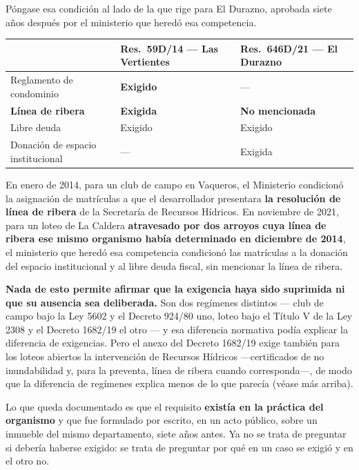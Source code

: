 \begin{cautela}
Póngase esa condición al lado de la que rige para El Durazno, aprobada siete años después por el ministerio que heredó esa competencia.

\begin{center}\small
\begin{tabular}{@{}p{3.4cm}p{4.3cm}p{4.3cm}@{}}
\toprule
& \textbf{Res.\ 59D/14} --- Las Vertientes & \textbf{Res.\ 646D/21} --- El Durazno \\
\midrule
Reglamento de condominio & \textbf{Exigido} & --- \\
\textbf{Línea de ribera} & \textbf{Exigida} & \textbf{No mencionada} \\
Libre deuda & Exigido & Exigido \\
Donación de espacio institucional & --- & Exigida \\
\bottomrule
\end{tabular}
\end{center}

En enero de 2014, para un club de campo en Vaqueros, el Ministerio condicionó la asignación de matrículas a que el desarrollador presentara \textbf{la resolución de línea de ribera} de la Secretaría de Recursos Hídricos. En noviembre de 2021, para un loteo de La Caldera \textbf{atravesado por dos arroyos cuya línea de ribera ese mismo organismo había determinado en diciembre de 2014}, el ministerio que heredó esa competencia condicionó las matrículas a la donación del espacio institucional y al libre deuda fiscal, sin mencionar la línea de ribera.

\textbf{Nada de esto permite afirmar que la exigencia haya sido suprimida ni que su ausencia sea deliberada.} Son dos regímenes distintos --- club de campo bajo la Ley 5602 y el Decreto 924/80 uno, loteo bajo el Título V de la Ley 2308 y el Decreto 1682/19 el otro --- y esa diferencia normativa podía explicar la diferencia de exigencias. Pero el anexo del Decreto 1682/19 exige también para los loteos abiertos la intervención de Recursos Hídricos ---certificados de no inundabilidad y, para la preventa, línea de ribera cuando corresponda---, de modo que la diferencia de regímenes explica menos de lo que parecía (véase más arriba).

Lo que queda documentado es que el requisito \textbf{existía en la práctica del organismo} y que fue formulado por escrito, en un acto público, sobre un inmueble del mismo departamento, siete años antes. Ya no se trata de preguntar si debería haberse exigido: se trata de preguntar por qué en un caso se exigió y en el otro no.
\end{cautela}

